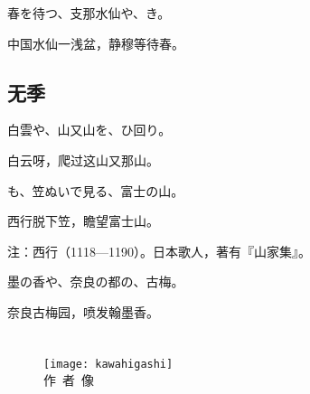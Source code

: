 \begin{haiku}
    {\FH 春を待つ、支那水仙や、き。}

    {\FK 中国水仙一浅盆，静穆等待春。}
\end{haiku}

\section{\FK 无季}

\setcounter{haikucounter}{0}

\begin{haiku}
    {\FH 白雲や、山又山を、ひ回り。}

    {\FK 白云呀，爬过这山又那山。}
\end{haiku}

\begin{haiku}
    {\FH {}も、笠ぬいで見る、富士の山。}

    {\FK 西行脱下笠，瞻望富士山。}

    {\FT 注：西行（1118—1190）。日本歌人，著有『山家集』。}
\end{haiku}

\begin{haiku}
    {\FH 墨の香や、奈良の都の、古梅。}

    {\FK 奈良古梅园，喷发翰墨香。}
\end{haiku}

\chapter[{\FM 河東碧梧桐}]{\FM {}}

\begin{center}
    \begin{figure}
        \centering
        \texttt{[image: kawahigashi]}\\[1em]
        \large{\FS 作~者~像}
    \end{figure}
\end{center}

\newpage

